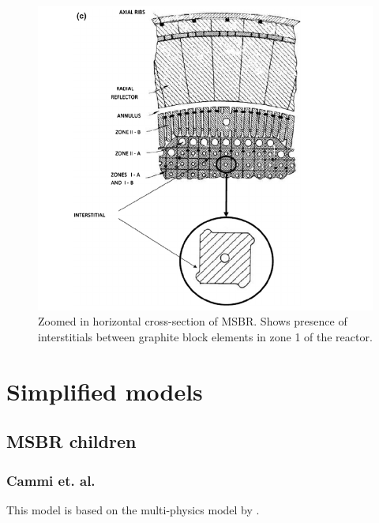 \documentclass{article}
\begin{document}
\begin{figure}[htpb]
  \centering
  \includegraphics{zoomed_horizontal_MSBR_cross_section.png}
  \caption{Zoomed in horizontal cross-section of MSBR. Shows presence of
    interstitials between graphite block elements in zone 1 of the reactor.}
  \label{fig:zoom_horiz}
\end{figure}

\section{Simplified models}

\subsection{MSBR children}

\subsubsection{Cammi et. al.}

This model is based on the multi-physics model by
\cite{cammi_multi-physics_2011}.

\FloatBarrier



\end{document}
